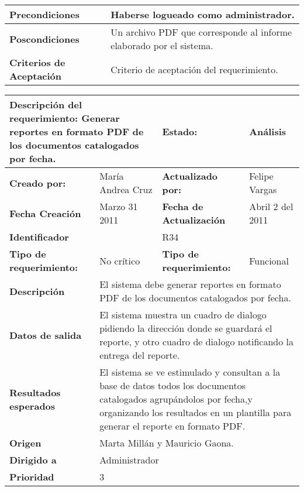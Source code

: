 \begin{center}
\begin{longtable}{|p{3cm}|p{3cm}|p{3cm}|p{3cm}|}
\bf Precondiciones &\multicolumn{3}{|p{10cm}|}{Haberse logueado como administrador.} \\
\hline
\hline
\bf Poscondiciones &\multicolumn{3}{|p{10cm}|}{Un archivo PDF que corresponde al informe elaborado por el sistema.} \\
\hline
\bf Criterios de Aceptación &\multicolumn{3}{|p{10cm}|}{Criterio de aceptación del requerimiento.} \\
\hline

\end{longtable}


\begin{longtable}{|p{3cm}|p{3cm}|p{3cm}|p{3cm}|}

\hline
\multicolumn{2}{|p{6cm}|}{{\bf {Descripción del requerimiento:}}   Generar reportes en formato PDF de los documentos catalogados por fecha.} & \bf{ Estado:} & {Análisis} \\
\hline
\bf {Creado por:} & María Andrea Cruz   & \bf {Actualizado por:} & Felipe Vargas  \\
\hline
\bf {Fecha Creación } & Marzo 31 2011 & \bf {Fecha de  Actualización }& Abril 2 del 2011\\
\hline 
\multicolumn{2}{|p{6cm}|}{\bf Identificador} & \multicolumn{2}{|p{6cm}|}{R34} \\
\hline
\bf {Tipo de requerimiento:} & No crítico &  \bf{Tipo de requerimiento:} & Funcional\\     
\hline
\bf Descripción &\multicolumn{3}{|p{10cm}|}{El sistema debe generar reportes en formato PDF de los documentos catalogados por fecha.} \\
\hline
\bf Datos de salida &\multicolumn{3}{|p{10cm}|}{El sistema muestra un cuadro de dialogo pidiendo la dirección donde se guardará el reporte, y otro cuadro de dialogo notificando la entrega del reporte.} \\
\hline
\bf Resultados esperados &\multicolumn{3}{|p{10cm}|}{El sistema se ve estimulado y consultan a la base de datos todos los documentos catalogados agrupándolos por fecha,y  organizando los resultados en un plantilla para generar el reporte en formato PDF.} \\
\hline
\bf Origen &\multicolumn{3}{|p{10cm}|}{Marta Millán y Mauricio Gaona.} \\
\hline
\bf Dirigido a  &\multicolumn{3}{|p{10cm}|}{Administrador} \\
\hline
\bf Prioridad &\multicolumn{3}{|p{10cm}|}{3} \\

\end{longtable}
\end{center}
